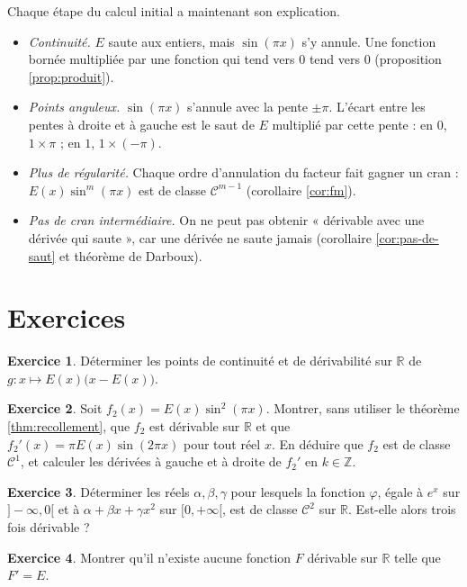 \documentclass[11pt,a4paper]{article}
\theoremstyle{plain}
\theoremstyle{definition}
\newtheorem{exercice}{Exercice}
\theoremstyle{remark}
\newcommand{\Z}{\mathbb{Z}}
\newcommand{\R}{\mathbb{R}}
\newcommand{\Cc}{\mathcal{C}}
\newcommand{\1}{\mathbf{1}}
\begin{document}
Chaque étape du calcul initial a maintenant son explication.
\begin{itemize}[nosep]
\item \emph{Continuité.} $E$ saute aux entiers, mais $\sin(\pi x)$ s'y annule. Une fonction bornée multipliée par une fonction qui tend vers $0$ tend vers $0$ (proposition \ref{prop:produit}).
\item \emph{Points anguleux.} $\sin(\pi x)$ s'annule avec la pente $\pm\pi$. L'écart entre les pentes à droite et à gauche est le saut de $E$ multiplié par cette pente : en $0$, $1\times\pi$ ; en $1$, $1\times(-\pi)$.
\item \emph{Plus de régularité.} Chaque ordre d'annulation du facteur fait gagner un cran : $E(x)\sin^m(\pi x)$ est de classe $\Cc^{m-1}$ (corollaire \ref{cor:fm}).
\item \emph{Pas de cran intermédiaire.} On ne peut pas obtenir « dérivable avec une dérivée qui saute », car une dérivée ne saute jamais (corollaire \ref{cor:pas-de-saut} et théorème de Darboux).
\end{itemize}

\section{Exercices}

\begin{exercice}
Déterminer les points de continuité et de dérivabilité sur $\R$ de $g\colon x\mapsto E(x)\big(x-E(x)\big)$.
\end{exercice}

\begin{exercice}
Soit $f_2(x)=E(x)\sin^2(\pi x)$. Montrer, sans utiliser le théorème \ref{thm:recollement}, que $f_2$ est dérivable sur $\R$ et que $f_2'(x)=\pi E(x)\sin(2\pi x)$ pour tout réel $x$. En déduire que $f_2$ est de classe $\Cc^1$, et calculer les dérivées à gauche et à droite de $f_2'$ en $k\in\Z$.
\end{exercice}

\begin{exercice}
Déterminer les réels $\alpha,\beta,\gamma$ pour lesquels la fonction $\varphi$, égale à $e^x$ sur $]-\infty,0[$ et à $\alpha+\beta x+\gamma x^2$ sur $[0,+\infty[$, est de classe $\Cc^2$ sur $\R$. Est-elle alors trois fois dérivable ?
\end{exercice}

\begin{exercice}
Montrer qu'il n'existe aucune fonction $F$ dérivable sur $\R$ telle que $F'=E$.
\end{exercice}
\end{document}
